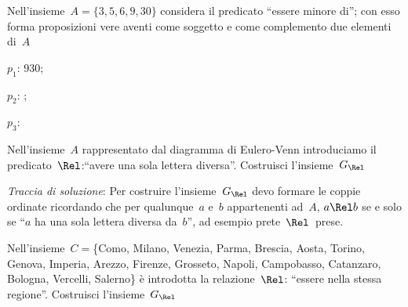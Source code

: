 \subsubsection*{}


\begin{esercizio}
\label{ese:B.2}
Nell'insieme~\(A = \{ 3,5,6,9,30 \}\) considera il predicato ``essere minore 
di''; 
con esso forma proposizioni vere aventi come soggetto e come complemento due 
elementi di~\(A\)
\begin{multicols}{3}
\begin{enumeratea}
\item \(p_1\): 930;
\item \(p_2\): \dotfill;
\item \(p_3\): \dotfill
\end{enumeratea}
\end{multicols}
\end{esercizio}

\begin{multicols}{2}

\begin{esercizio}
\label{ese:B.3}
Nell'insieme~\(A\) rappresentato dal diagramma di Eulero-Venn 
introduciamo il predicato~\(\Rel\):``avere
una sola lettera diversa''. Costruisci l'insieme~\(G_\Rel\)

\emph{Traccia di soluzione}:
Per costruire l'insieme~\(G_\Rel\) devo formare le coppie ordinate ricordando 
che per qualunque~\(a\) e~\(b\) appartenenti ad~\(A\), \(a \Rel b\)
se e solo se ``\(a\) ha una sola lettera diversa da~\(b\)'', ad esempio 
prete~\( \Rel\)~prese.

\begin{center}
\begin{inaccessibleblock}
 
\end{inaccessibleblock}
\end{center}

\end{esercizio}

\end{multicols}

\begin{esercizio}
\label{ese:B.4}
Nell'insieme~\(C = \)\{Como, Milano, Venezia, Parma, Brescia, Aosta, Torino, 
Genova, Imperia, Arezzo, Firenze, Grosseto, Napoli, Campobasso, Catanzaro, 
Bologna, Vercelli, Salerno\} è introdotta la relazione~\(\Rel\): 
``essere nella stessa regione''. Costruisci l'insieme~\(G_\Rel\)
\end{esercizio}

